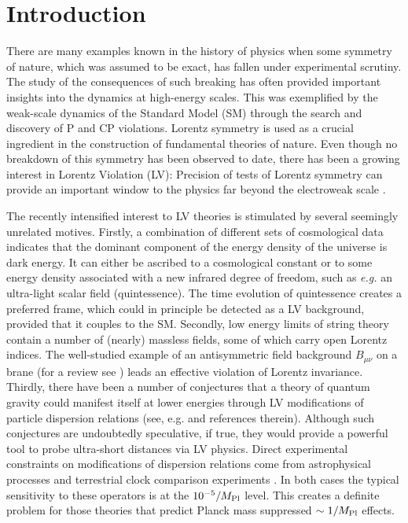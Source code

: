 \documentclass[12pt]{revtex4}
\begin{document}
\begin{titlepage}
\end{titlepage}


\newpage

\setcounter{footnote}{0}
\setcounter{equation}{0}


\section{Introduction}
\label{Intro}


There are many examples known in the history of physics when some
symmetry of nature, which was assumed to be exact, has fallen under
experimental scrutiny. The study of the consequences of such breaking
has often provided important insights into the dynamics at
high-energy scales. This was exemplified by the weak-scale dynamics of
the Standard Model (SM) through the search and discovery of P and CP 
violations. Lorentz symmetry is used as a crucial ingredient in the
construction of fundamental theories of nature. Even though no
breakdown of this symmetry has been observed to date, there has been a
growing interest in Lorentz Violation (LV): Precision of 
tests of Lorentz symmetry can provide an important window to the
physics far beyond the electroweak scale
\cite{Kost1,CG,Jacobsonreview,PhysToday,Sigl:2004cq,Mattingly:2005re}. 


The recently intensified interest to LV theories is stimulated by
several seemingly unrelated motives. Firstly, a combination of different sets of 
cosmological data indicates that the dominant component of the energy
density of the universe is dark energy. It can either be ascribed
to a cosmological constant or to some energy density associated with a
new infrared degree of freedom, such as {\em e.g.} an ultra-light
scalar field (quintessence). The time evolution of quintessence
creates a preferred frame, which could in principle be detected as a
LV background, provided that it couples to the SM. Secondly, low energy
limits of string theory contain a number of (nearly) massless fields,
some of which carry open Lorentz indices. The well-studied 
example of an antisymmetric field background $B_{\mu\nu}$ on a brane
(for a review see \cite{DN}) leads an effective violation of Lorentz
invariance. Thirdly, there have been a number of conjectures that a
theory of quantum gravity could manifest itself at lower energies
through LV modifications of particle dispersion relations 
(see, e.g. \cite{lcq,Vucetich:2005ra} and references therein). Although such
conjectures are undoubtedly speculative, if true, they would provide a
powerful tool to probe ultra-short distances via LV physics.  Direct
experimental constraints on modifications of dispersion relations come
from astrophysical processes \cite{CFJ,AmC,Ted1,GK,Kost2,Sarkar} and
terrestrial clock comparison experiments \cite{clock1,clock2,Vuc,MP:}. 
In both cases the typical sensitivity to these operators is at the
$10^{-5}/M_{\rm Pl}$ level. This creates a definite problem for those
theories that predict Planck mass suppressed $\sim 1/M_{\rm Pl}$
effects. 
\end{document}
